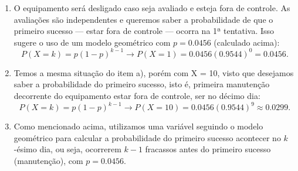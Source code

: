 \documentclass[
	12pt,				%
	openright,			%
	oneside,			%
	a4paper,			%
	english,			%
	brazil,				%
	]{abntex2}
\begin{document}
\begin{enumerate}[label=\alph*)]
    \item O equipamento será desligado caso seja avaliado e esteja fora de controle. As avaliações são independentes e queremos saber a probabilidade de que o primeiro sucesso --- estar fora de controle --- ocorra na 1ª tentativa. Isso sugere o uso de um modelo geométrico com $p = 0.0456$ (calculado acima):
    $$P(X = k) = p(1-p)^{k-1} \to P(X = 1) = 0.0456(0.9544)^0 = 0.0456.$$
    
    \item Temos a mesma situação do item a), porém com X = 10, visto que desejamos saber a probabilidade do primeiro sucesso, isto é, primeira manutenção decorrente do equipamento estar fora de controle, ser no décimo dia:
    $$P(X = k) = p(1-p)^{k-1} \to P(X = 10) = 0.0456(0.9544)^9 \approx 0.0299.$$
    
    \item Como mencionado acima, utilizamos uma variável seguindo o modelo geométrico para calcular a probabilidade do primeiro sucesso acontecer no $k$-ésimo dia, ou seja, ocorrerem $k - 1$ fracassos antes do primeiro sucesso (manutenção), com $p = 0.0456$.
\end{enumerate}
\end{document}
